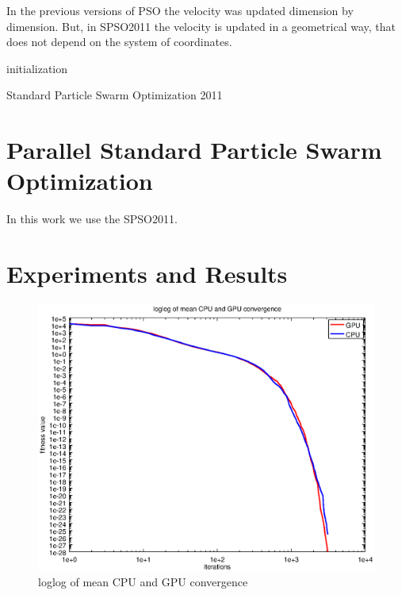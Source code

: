\documentclass{article}
\begin{document}
	In the previous versions of PSO the velocity was updated dimension by dimension.
	But, in SPSO2011 the velocity is updated in a geometrical way,  that does not depend on the system of coordinates.

	\begin{algorithm}[H]
		initialization\;
		\caption{Standard Particle Swarm Optimization 2011}
	\end{algorithm}

	\section{Parallel Standard Particle Swarm Optimization}

	In this work we use the SPSO2011.


	\section{Experiments and Results}

	\begin{figure}[!htb]
		\centering
		\includegraphics[width=.8\textwidth]{../img/loglog_convergence.eps}
		\caption{loglog of mean CPU and GPU convergence}
		\label{fig:loglog_convergence}
	\end{figure}
\end{document}
